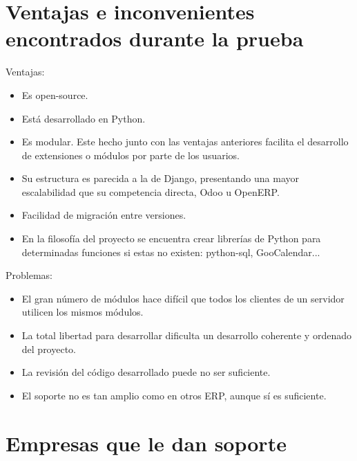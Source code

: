 \documentclass{article}
\begin{document}

\section{Ventajas e inconvenientes encontrados durante la prueba}

Ventajas:

\begin{itemize}
    \item Es open-source.
    \item Está desarrollado en Python.
    \item Es modular. Este hecho junto con las ventajas anteriores facilita el desarrollo de extensiones o módulos por parte de los usuarios.
    \item Su estructura es parecida a la de Django, presentando una mayor escalabilidad que su competencia directa, Odoo u OpenERP.
    \item Facilidad de migración entre versiones.
    \item En la filosofía del proyecto se encuentra crear librerías de Python para determinadas funciones si estas no existen: python-sql, GooCalendar...
\end{itemize}

Problemas:

\begin{itemize}
    \item El gran número de módulos hace difícil que todos los clientes de un servidor utilicen los mismos módulos.
    \item La total libertad para desarrollar dificulta un desarrollo coherente y ordenado del proyecto.
    \item La revisión del código desarrollado puede no ser suficiente.
    \item El soporte no es tan amplio como en otros ERP, aunque sí es suficiente.
\end{itemize}


\section{Empresas que le dan soporte}
\end{document}
